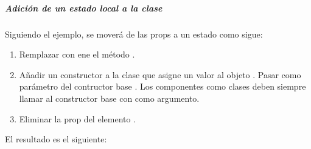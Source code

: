 %
\begin{sphinxVerbatim}[commandchars=\\\{\}]
    
   
     
\end{sphinxVerbatim}


\subparagraph{Adición de un estado local a la clase}
\label{\detokenize{reactjs:adicion-de-un-estado-local-a-la-clase}}
Siguiendo el ejemplo, se moverá  de las props a un estado como sigue:
\begin{enumerate}
\item {} 
Remplazar  con  ene el método .

\item {} 
Añadir un constructor a la clase que asigne un valor al objeto . Pasar como parámetro del contructor base . Los componentes como clases deben siempre llamar al constructor base con  como argumento.

\item {} 
Eliminar la prop  del elemento .

\end{enumerate}

El resultado es el siguiente:

